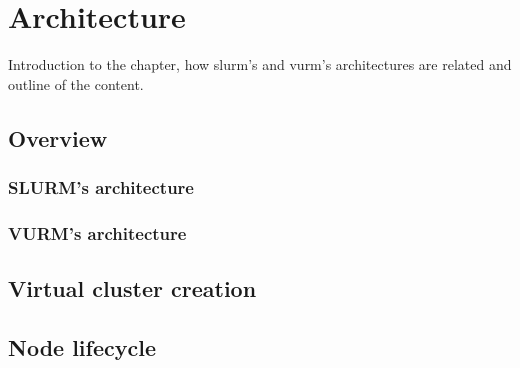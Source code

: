 \chapter{Architecture}

\begin{todo}
Introduction to the chapter, how slurm's and vurm's architectures are related and outline of the content.
\end{todo}

\section{Overview}



\subsection{SLURM's architecture}





\subsection{VURM's architecture}



\section{Virtual cluster creation}



\section{Node lifecycle}
\cite{example}